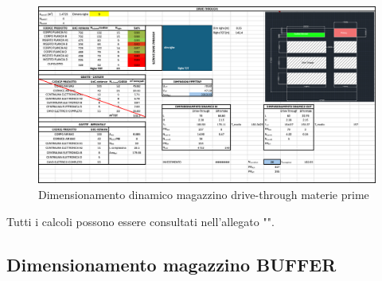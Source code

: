 \documentclass[11pt]{article}
\begin{document}
\begin{figure} [H]
    \centering
    \includegraphics[width=\textwidth]{images/Dimensionamento dinamico magazzino drive-through MP.png}
    \caption{Dimensionamento dinamico magazzino drive-through materie prime}
    \label{fig: Dimensionamento dinamico magazzino drive-through MP}
\end{figure}

\noindent
Tutti i calcoli possono essere consultati nell'allegato "".
\newpage

\subsection{Dimensionamento magazzino BUFFER}
\end{document}
